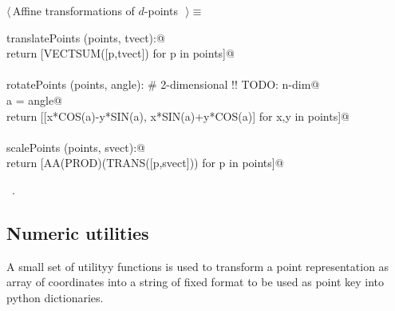 \documentclass[11pt,oneside]{article}	%
\begin{document}
\begin{flushleft} \small \label{scrap51}
$\langle\,$Affine transformations of $d$-points\nobreak\ {\footnotesize {}}$\,\rangle\equiv$
\vspace{-1ex}
\begin{list}{}{} \item
\mbox{}\verb@def translatePoints (points, tvect):@\\
\mbox{}\verb@   return [VECTSUM([p,tvect]) for p in points]@\\
\mbox{}\verb@@\\
\mbox{}\verb@def rotatePoints (points, angle):      # 2-dimensional !! TODO: n-dim@\\
\mbox{}\verb@   a = angle@\\
\mbox{}\verb@   return [[x*COS(a)-y*SIN(a), x*SIN(a)+y*COS(a)] for x,y in points]@\\
\mbox{}\verb@@\\
\mbox{}\verb@def scalePoints (points, svect):@\\
\mbox{}\verb@   return [AA(PROD)(TRANS([p,svect])) for p in points]@\\
\mbox{}\verb@@{\NWsep}
\end{list}
\vspace{-1ex}
\footnotesize\addtolength{\baselineskip}{-1ex}
\begin{list}{}{\setlength{\itemsep}{-\parsep}\setlength{\itemindent}{-\leftmargin}}
\item \NWtxtMacroRefIn\ .
\end{list}
\end{flushleft}



\subsection{Numeric utilities}

A small set of utilityy functions is used to transform a point representation as array of coordinates into a string of fixed format to be used as point key into python dictionaries.
\end{document}

